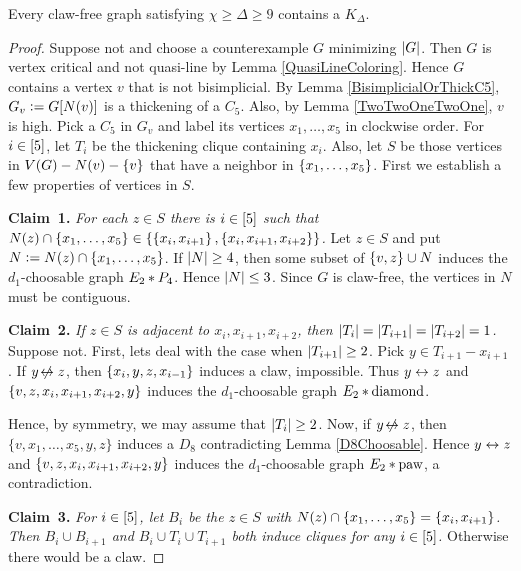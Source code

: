 \begin{thm}\label{BKClawFree}
Every claw-free graph satisfying $\chi \geq \Delta \geq 9$ contains a
$K_\Delta$.
\end{thm}
\begin{proof}
Suppose not and choose a counterexample $G$ minimizing $\left|G\right|$.  Then $G$ is
vertex critical and not quasi-line by Lemma \ref{QuasiLineColoring}.  Hence $G$
contains a vertex $v$ that is not bisimplicial.  By Lemma
\ref{BisimplicialOrThickC5}, $G_v \mathrel{\mathop:}= G[N(v)]$ is a thickening of a
$C_5$.  Also, by Lemma \ref{TwoTwoOneTwoOne}, $v$ is high. Pick a $C_5$ in
$G_v$ and label its vertices $x_1, \ldots, x_5$ in clockwise order.  For $i \in \left[5\right]$, let $T_i$ be the thickening clique
containing $x_i$.  Also, let $S$ be those vertices in $V(G) - N(v) - \left\{ v \right\}$
that have a neighbor in $\left\{ x_1, \ldots, x_5 \right\}$.  First we establish a few
properties of vertices in $S$. 

\textbf{Claim~1.} \textit{For each $z \in S$ there is $i \in \left[5\right]$ such that $N(z) \cap \left\{ x_1, \ldots, x_5 \right\} \in \{\left\{ x_i, x_{i+1} \right\}, \left\{ x_i, x_{i+1}, x_{i+2} \right\}\}$.} 
Let $z \in S$ and put $N \mathrel{\mathop:}= N(z) \cap \left\{ x_1, \ldots, x_5 \right\}$.  If
$\left|N\right| \geq 4$, then some subset of $\left\{ v, z \right\} \cup N$ induces the
$d_1$-choosable graph $E_2 \mbox{\hspace{2 pt}$\ast$\hspace{2 pt}} P_4$.  Hence $\left|N\right| \leq 3$.  Since $G$ is
claw-free, the vertices in $N$ must be contiguous.

\textbf{Claim~2.} \textit{If $z \in S$ is adjacent to $x_i, x_{i+1}, x_{i+2}$, then $\left|T_i\right| =
\left|T_{i+1}\right| = \left|T_{i+2}\right| = 1$.}
Suppose not. First, lets deal with the case when $\left|T_{i+1}\right| \geq 2$.  Pick
$y \in T_{i+1} - x_{i+1}$.  If $y \not\!\leftrightarrow z$, then $\left\{ x_i, y, z, x_{i-1} \right\}$
induces a claw, impossible.  Thus $y \leftrightarrow z$ and $\left\{ v, z, x_i, x_{i+1},
x_{i+2}, y \right\}$ induces the $d_1$-choosable graph $E_2 \mbox{\hspace{2 pt}$\ast$\hspace{2 pt}} \text{diamond}$.

Hence, by symmetry, we may assume that $\left|T_i\right| \geq 2$.  Now, if $y \not\!\leftrightarrow z$,
then $\{v, x_1, \ldots, x_5, y, z\}$ induces a $D_8$ contradicting Lemma
\ref{D8Choosable}.  Hence $y \leftrightarrow z$ and $\left\{ v, z, x_i, x_{i+1},
x_{i+2}, y \right\}$ induces the $d_1$-choosable graph $E_2 \mbox{\hspace{2 pt}$\ast$\hspace{2 pt}} \text{paw}$, a
contradiction.

\textbf{Claim~3.} \textit{For $i \in \left[5\right]$, let $B_i$ be the $z \in S$ with
$N(z) \cap \left\{ x_1, \ldots, x_5 \right\} = \left\{ x_i, x_{i+1} \right\}$.  Then $B_i \cup B_{i+1}$ and $B_i \cup T_i \cup T_{i+1}$ both induce cliques for any
$i \in \left[5\right]$.}
Otherwise there would be a claw.


\end{proof}
